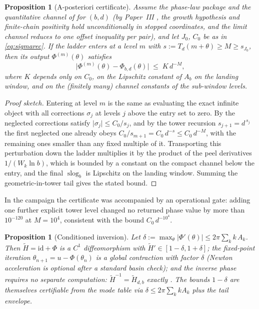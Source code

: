 \documentclass[11pt,a4paper]{article}
\newtheorem{proposition}[theorem]{Proposition}
\theoremstyle{definition}
\theoremstyle{remark}
\newcommand{\slog}{\operatorname{slog}}
\begin{document}
\begin{proposition}[A-posteriori certificate]\label{prop:cert}
Assume the phase-law package and the quantitative channel of \cite{unified} for $(b,d)$
(by Paper~III \cite{paperIII}, the growth hypothesis and finite-chain positivity hold
unconditionally in stopped coordinates, and the limit channel reduces to one offset
inequality per pair), and
let $J_0$, $C_0$ be as in \eqref{eq:sigmarec}. If the ladder enters at a level $m$ with
$s:=T_d(m+\theta)\ge M\ge s_{J_0}$, then its output $\Phi^{(m)}(\theta)$ satisfies
\[
\bigl|\Phi^{(m)}(\theta)-\Phi_{b,d}(\theta)\bigr|\;\le\;K\,d^{-M},
\]
where $K$ depends only on $C_0$, on the Lipschitz constant of $A_b$ on the landing window,
and on the (finitely many) channel constants of the sub-window levels.
\end{proposition}

\begin{proof}[Proof sketch]
Entering at level $m$ is the same as evaluating the exact infinite object with all
corrections $\sigma_j$ at levels $j$ above the entry set to zero. By
\cite[Lem.~6.3]{unified} the neglected corrections satisfy
$\lvert\sigma_j\rvert\le C_0/s_j$, and by the tower recursion $s_{j+1}=d^{\,s_j}$ the first
neglected one already obeys $C_0/s_{m+1}=C_0\,d^{-s}\le C_0\,d^{-M}$, with the remaining ones
smaller than any fixed multiple of it. Transporting this perturbation down the ladder
multiplies it by the product of the peel derivatives $1/(W_k\ln b)$, which is bounded by a
constant on the compact channel below the entry, and the final $\slog_b$ is Lipschitz on the
landing window. Summing the geometric-in-tower tail gives the stated bound.
\end{proof}

In the campaign the certificate was accompanied by an operational gate: adding one further
explicit tower level changed no returned phase value by more than $10^{-120}$ at $M=10^4$,
consistent with the bound $C_0\,d^{-10^4}$.

\begin{proposition}[Conditioned inversion]\label{prop:newton}
Let $\delta:=\max_\theta\lvert\Phi'(\theta)\rvert\le 2\pi\sum_k k\,A_k$. Then
$\widetilde H=\mathrm{id}+\Phi$ is a $C^1$ diffeomorphism with
$\widetilde H'\in[1-\delta,1+\delta]$; the fixed-point iteration
$\theta_{n+1}=u-\Phi(\theta_n)$ is a \emph{global} contraction with factor
$\delta$ (Newton acceleration is optional after a standard basin check); and
the inverse phase requires no separate
computation: $\widetilde H^{-1}=\widetilde H_{d,b}$ exactly \cite[Thm.~A]{unified}.
The bounds $1-\delta$ are themselves certifiable from the mode table via
$\delta\le2\pi\sum_k kA_k$ plus the tail envelope.
\end{proposition}
\end{document}
